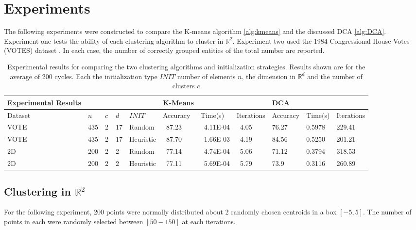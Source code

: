 \section{Experiments}
The following experiments were constructed to compare the K-means algorithm \ref{alg:kmeans} and the discussed DCA \ref{alg:DCA}. Experiment one tests the ability of each clustering algorithm to cluster in $\mathbb{R}^2$. Experiment two used the  1984 Congressional House-Votes  (VOTES) dataset \cite{noauthor_cluster_nodate}. In each case, the number of correctly grouped entities of the total number are reported.
\begin{@twocolumntrue}
\begin{table*}[ht!]
    \centering
    \caption{Experimental results for comparing the two clustering algorithms and initialization strategies. Results shown are for the average of $200$ cycles. Each the  initialization type $INIT$ number of elements $n$, the dimension in $\mathbb{R}^d$ and the number of clusters $c$ }
    \begin{tabular}{lllllllllll}
    \hline
        Experimental Results & ~ & ~ & ~ & ~ & K-Means & ~ & ~ & DCA & ~ &   \\ \hline
        Dataset & $n$ & $c$ & $d$ & $INIT$ & Accuracy & Time(s) & Iterations & Accuracy & Time(s) & Iterations  \\ 
        VOTE & 435 & 2 & 17 & Random & \ 87.23 & \ 4.11E-04 & \ 4.05 & 76.27 & 0.5978 & 229.41  \\ 
        VOTE & 435 & 2 & 17 & Heuristic & \ 87.70 & \ 1.66E-03 & \ 4.19 & 84.56 & 0.5250 & 201.21  \\ 
        2D  & 200 & 2 & 2 & Random & \ 77.14 & \ 4.74E-04 & \  5.06 & 71.12 & 0.3794 & 318.53  \\ 
        2D & 200 & 2 & 2 & Heuristic & \ 77.11 & \ 5.69E-04 & \ 5.79 & 73.9 & 0.3116 & 260.89  \\ \hline
    \end{tabular}
    \label{tab:exresults}
\end{table*}
\end{@twocolumntrue}
\subsection{Clustering in $\mathbb{R}^2$}
For the following experiment, 200 points were normally distributed about 2 randomly chosen centroids in a box $[-5,5]$. The number of points in each were randomly selected between $[50-150]$ at each iterations. 

